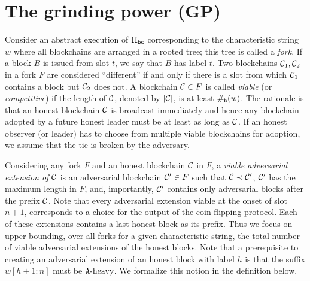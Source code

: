 \section{The grinding power (GP)}

Consider an abstract execution of $\Pi_\mathsf{bc}$ 
corresponding to the characteristic string $w$ 
where 
all blockchains are arranged in a rooted tree; 
this tree is called a \emph{fork}. 
If a block $B$ is issued from slot $t$, 
we say that $B$ has label $t$.
Two blockchains $\mathcal{C}_1, \mathcal{C}_2$ in a fork $F$ are considered ``different'' 
if and only if there is a slot from which 
$\mathcal{C}_1$ contains a block but $\mathcal{C}_2$ does not. 
A blockchain $\mathcal{C} \in F$ is called \emph{viable} (or \emph{competitive}) 
if the length of $\mathcal{C}$, denoted by $|\mathcal{C}|$, 
is at least $\#_{\mathtt{h}}(w)$. 
The rationale is that an honest blockchain $\mathcal{C}$ is broadcast immediately 
and hence any blockchain adopted by a future honest leader
must be at least as long as $\mathcal{C}$. 
If an honest observer (or leader) has to choose from multiple viable blockchains for adoption, 
we assume that the tie is broken by the adversary. 

Considering any fork $F$ and an honest blockchain $\mathcal{C}$ in $F$, 
a \emph{viable adversarial extension of $\mathcal{C}$} 
is an adversarial blockchain $\mathcal{C}' \in F$ 
such that $\mathcal{C} \prec \mathcal{C}'$, 
$\mathcal{C}'$ has the maximum length in $F$, 
and, importantly, $\mathcal{C}'$ contains only adversarial blocks after the prefix $\mathcal{C}$. 
Note that every adversarial extension 
viable at the onset of slot $n + 1$, 
corresponds to a choice 
for the output of the coin-flipping protocol. 
Each of these extensions contains a last honest block as its prefix. 
Thus we focus on upper bounding, 
over all forks for a given characteristic string, 
the total number of viable adversarial extensions 
of the honest blocks.
Note that a prerequisite to creating an adversarial extension 
of an honest block with label $h$ is that 
the suffix $w[h + 1 : n]$ must be $\mathtt{A}\text{-heavy}$.
We formalize this notion in the definition below.

